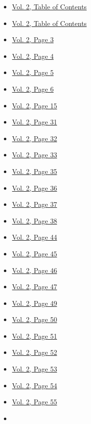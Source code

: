 \begin{itemize}
  \begin{itemize}
  \tightlist
  \item
    \protect\hyperlink{g-page-209}{Vol. 2, Table of Contents}
  \item
    \protect\hyperlink{g-page-211}{Vol. 2, Table of Contents}
  \item
    \protect\hyperlink{g-page-215}{Vol. 2, Page 3}
  \item
    \protect\hyperlink{g-page-216}{Vol. 2, Page 4}
  \item
    \protect\hyperlink{g-page-217}{Vol. 2, Page 5}
  \item
    \protect\hyperlink{g-page-218}{Vol. 2, Page 6}
  \item
    \protect\hyperlink{g-page-227}{Vol. 2, Page 15}
  \item
    \protect\hyperlink{g-page-243}{Vol. 2, Page 31}
  \item
    \protect\hyperlink{g-page-244}{Vol. 2, Page 32}
  \item
    \protect\hyperlink{g-page-245}{Vol. 2, Page 33}
  \item
    \protect\hyperlink{g-page-247}{Vol. 2, Page 35}
  \item
    \protect\hyperlink{g-page-248}{Vol. 2, Page 36}
  \item
    \protect\hyperlink{g-page-249}{Vol. 2, Page 37}
  \item
    \protect\hyperlink{g-page-250}{Vol. 2, Page 38}
  \item
    \protect\hyperlink{g-page-256}{Vol. 2, Page 44}
  \item
    \protect\hyperlink{g-page-257}{Vol. 2, Page 45}
  \item
    \protect\hyperlink{g-page-258}{Vol. 2, Page 46}
  \item
    \protect\hyperlink{g-page-259}{Vol. 2, Page 47}
  \item
    \protect\hyperlink{g-page-261}{Vol. 2, Page 49}
  \item
    \protect\hyperlink{g-page-262}{Vol. 2, Page 50}
  \item
    \protect\hyperlink{g-page-263}{Vol. 2, Page 51}
  \item
    \protect\hyperlink{g-page-264}{Vol. 2, Page 52}
  \item
    \protect\hyperlink{g-page-265}{Vol. 2, Page 53}
  \item
    \protect\hyperlink{g-page-266}{Vol. 2, Page 54}
  \item
    \protect\hyperlink{g-page-267}{Vol. 2, Page 55}
  \item

\end{itemize}
\end{itemize}
